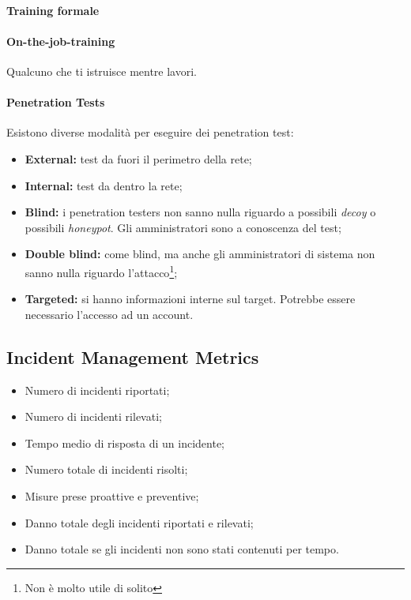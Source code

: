 \paragraph*{Training formale}

\paragraph*{On-the-job-training} Qualcuno che ti istruisce mentre lavori.


\paragraph*{Penetration Tests} Esistono diverse modalità per eseguire dei
penetration test:
\begin{itemize}
\item \textbf{External:} test da fuori il perimetro della rete;
\item \textbf{Internal:} test da dentro la rete;
\item \textbf{Blind:} i penetration testers non sanno nulla riguardo a possibili
\textit{decoy} o possibili \textit{honeypot}. Gli amministratori sono a
conoscenza del test;
\item \textbf{Double blind:} come blind, ma anche gli amministratori di sistema non sanno
nulla riguardo l'attacco\footnote{Non è molto utile di solito};
\item \textbf{Targeted:} si hanno informazioni interne sul target. Potrebbe essere
necessario l'accesso ad un account.
\end{itemize}

\subsection{Incident Management Metrics}

\begin{itemize}
\item Numero di incidenti riportati;
\item Numero di incidenti rilevati;
\item Tempo medio di risposta di un incidente;
\item Numero totale di incidenti risolti;
\item Misure prese proattive e preventive;
\item Danno totale degli incidenti riportati e rilevati;
\item Danno totale se gli incidenti non sono stati contenuti per tempo.
\end{itemize}

